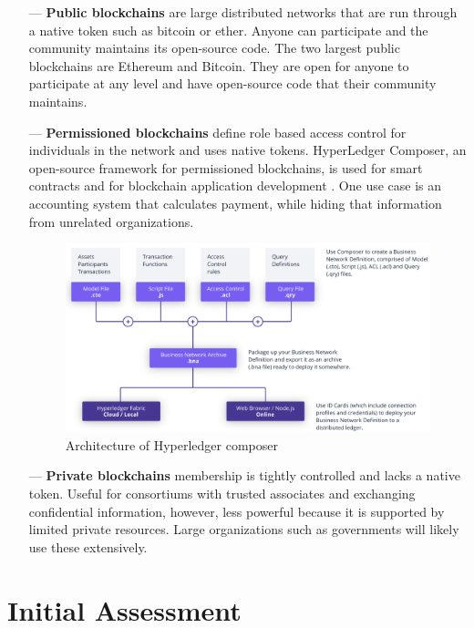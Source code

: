 \documentclass[12pt]{scrartcl}
\begin{document}
\begin{itemize}
	\item[---] \textbf{Public blockchains} are large distributed networks that are run through a native token such as bitcoin or ether. Anyone can participate and the community maintains its open-source code. The two largest public blockchains are Ethereum and Bitcoin. They are open for anyone to participate at any level and have open-source code that their community maintains.
	\item[---] \textbf{Permissioned blockchains} define role based access control for individuals in the network and uses native tokens.  HyperLedger Composer, an open-source framework for permissioned blockchains, is used for smart contracts and for blockchain application development \cite{hyperledgerComposer:Online}. One use case is an accounting system that calculates payment, while hiding that information from unrelated organizations.  \hfill \break %
	\begin{figure}[ht]
	\includegraphics[width=1\linewidth]{composer-arch.png}
	\caption{Architecture of Hyperledger composer}
	\end{figure}
	\item[---] \textbf{Private blockchains}  membership is tightly controlled and lacks a native token. Useful for consortiums with trusted associates and exchanging confidential information, however, less powerful because it is supported by limited private resources. Large organizations such as governments will likely use these extensively.
\end{itemize}

\newpage 
\section{Initial Assessment}
\end{document}

